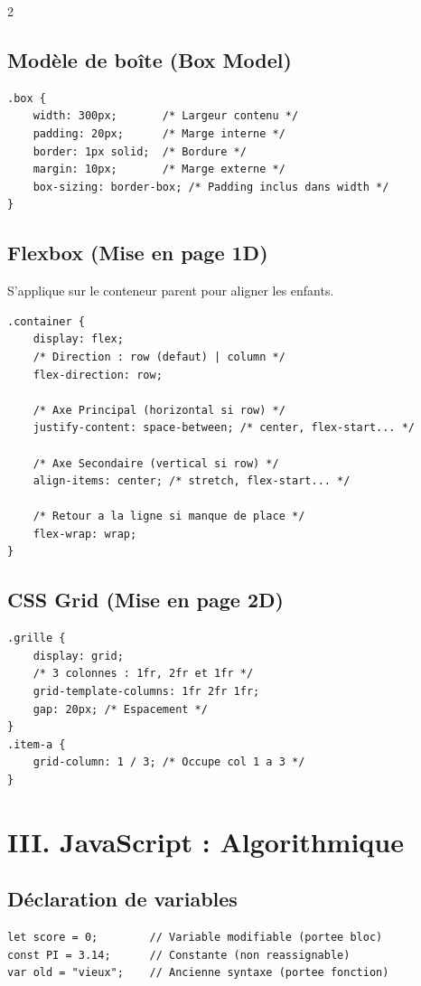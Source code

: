 \documentclass[11pt,a4paper]{article}
\begin{document}
\begin{multicols*}{2}
\subsection{Modèle de boîte (Box Model)}
\begin{lstlisting}
.box {
    width: 300px;       /* Largeur contenu */
    padding: 20px;      /* Marge interne */
    border: 1px solid;  /* Bordure */
    margin: 10px;       /* Marge externe */
    box-sizing: border-box; /* Padding inclus dans width */
}
\end{lstlisting}

\subsection{Flexbox (Mise en page 1D)}
S'applique sur le conteneur parent pour aligner les enfants.
\begin{lstlisting}
.container {
    display: flex;
    /* Direction : row (defaut) | column */
    flex-direction: row; 
    
    /* Axe Principal (horizontal si row) */
    justify-content: space-between; /* center, flex-start... */
    
    /* Axe Secondaire (vertical si row) */
    align-items: center; /* stretch, flex-start... */
    
    /* Retour a la ligne si manque de place */
    flex-wrap: wrap; 
}
\end{lstlisting}

\subsection{CSS Grid (Mise en page 2D)}
\begin{lstlisting}
.grille {
    display: grid;
    /* 3 colonnes : 1fr, 2fr et 1fr */
    grid-template-columns: 1fr 2fr 1fr; 
    gap: 20px; /* Espacement */
}
.item-a {
    grid-column: 1 / 3; /* Occupe col 1 a 3 */
}
\end{lstlisting}

\section{III. JavaScript : Algorithmique}

\subsection{Déclaration de variables}
\begin{lstlisting}
let score = 0;        // Variable modifiable (portee bloc)
const PI = 3.14;      // Constante (non reassignable)
var old = "vieux";    // Ancienne syntaxe (portee fonction)
\end{lstlisting}


\end{multicols*}
\end{document}
